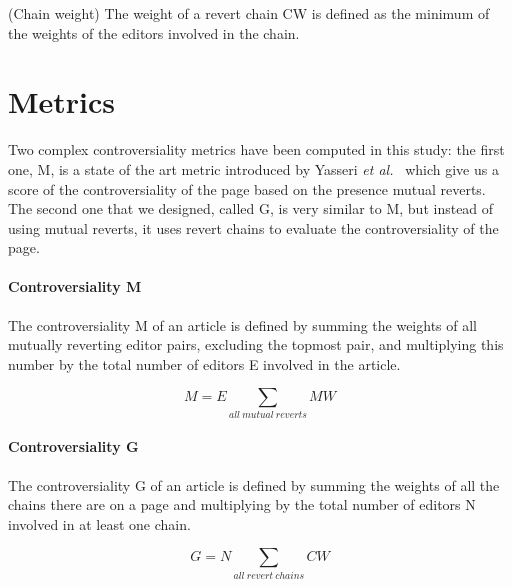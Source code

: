 \begin{Definition}
    (Chain weight) The weight of a revert chain CW is defined as the minimum of the weights of the editors involved in the chain.
\end{Definition}


\section{Metrics}
Two complex controversiality metrics have been computed in this study: the first one, M, is a state of the
art metric introduced by Yasseri \textit{et al.}~\cite{Yasseri2014} which give us a score of the controversiality of the page
based on the presence mutual reverts. The second one that we designed, called G, is very similar to M, but
instead of using mutual reverts, it uses revert chains to evaluate the controversiality of the page.  

\paragraph*{Controversiality M}
The controversiality M of an article is defined by summing the weights of all mutually reverting
editor pairs, excluding the topmost pair, and multiplying this number by the total number of editors
E involved in the article.

\begin{equation}
    M = E   \sum_{all\ mutual\ reverts} MW
\end{equation}

\paragraph*{Controversiality G}
The controversiality G of an article is defined by summing the weights of all the chains
there are on a page and multiplying by the total number of editors N involved in at least one chain.

\begin{equation}
    G = N \sum_{all\ revert\ chains} CW
\end{equation}




